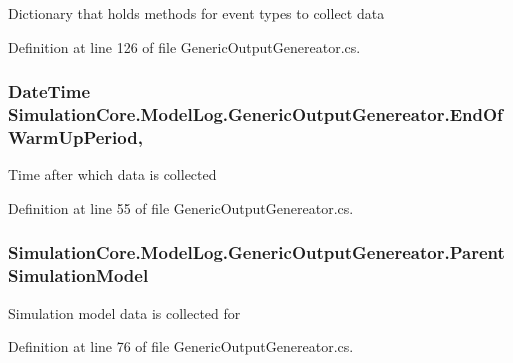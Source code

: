 Dictionary that holds methods for event types to collect data 



Definition at line 126 of file Generic\+Output\+Genereator.\+cs.

\subsubsection[{\texorpdfstring{End\+Of\+Warm\+Up\+Period}{EndOfWarmUpPeriod}}]{\setlength{\rightskip}{0pt plus 5cm}Date\+Time Simulation\+Core.\+Model\+Log.\+Generic\+Output\+Genereator.\+End\+Of\+Warm\+Up\+Period\hspace{0.3cm}{\ttfamily [get]}, {\ttfamily [set]}}\hypertarget{class_simulation_core_1_1_model_log_1_1_generic_output_genereator_adc657e74cabd69839520c36abefe8b7b}{}\label{class_simulation_core_1_1_model_log_1_1_generic_output_genereator_adc657e74cabd69839520c36abefe8b7b}


Time after which data is collected 



Definition at line 55 of file Generic\+Output\+Genereator.\+cs.

\subsubsection[{\texorpdfstring{Parent\+Simulation\+Model}{ParentSimulationModel}}]{ Simulation\+Core.\+Model\+Log.\+Generic\+Output\+Genereator.\+Parent\+Simulation\+Model\hspace{0.3cm}{\ttfamily [get]}}\hypertarget{class_simulation_core_1_1_model_log_1_1_generic_output_genereator_a7af7fadff3b796a1f5c73a8b0033f3a5}{}\label{class_simulation_core_1_1_model_log_1_1_generic_output_genereator_a7af7fadff3b796a1f5c73a8b0033f3a5}


Simulation model data is collected for 



Definition at line 76 of file Generic\+Output\+Genereator.\+cs.


